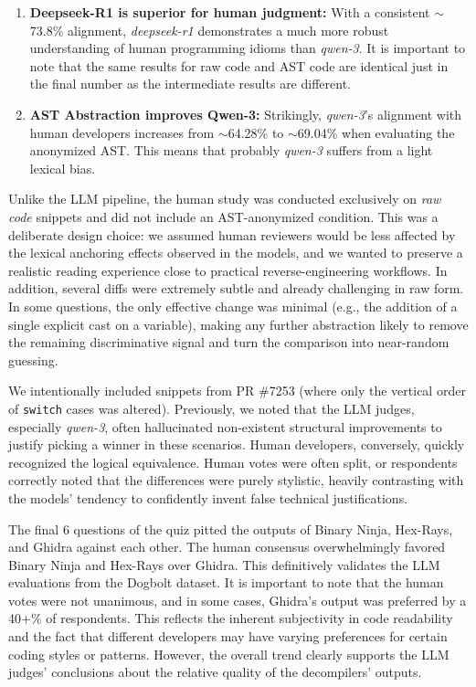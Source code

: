 \begin{enumerate}
    \item \textbf{Deepseek-R1 is superior for human judgment:} With a consistent $\sim$73.8\% alignment, \emph{deepseek-r1} demonstrates a much more robust understanding of human programming idioms than \emph{qwen-3}. It is important to note that the same results for raw code and \ac{AST} code are identical just in the final number as the intermediate results are different.
    \item \textbf{AST Abstraction improves Qwen-3:} Strikingly, \emph{qwen-3}'s alignment with human developers increases from $\sim$64.28\% to $\sim$69.04\% when evaluating the anonymized \ac{AST}. This means that probably \emph{qwen-3} suffers from a light lexical bias.
\end{enumerate}

Unlike the \ac{LLM} pipeline, the human study was conducted exclusively on \emph{raw code} snippets and did not include an \ac{AST}-anonymized condition. This was a deliberate design choice: we assumed human reviewers would be less affected by the lexical anchoring effects observed in the models, and we wanted to preserve a realistic reading experience close to practical reverse-engineering workflows. In addition, several diffs were extremely subtle and already challenging in raw form. In some questions, the only effective change was minimal (e.g., the addition of a single explicit cast on a variable), making any further abstraction likely to remove the remaining discriminative signal and turn the comparison into near-random guessing.

We intentionally included snippets from PR \#7253 (where only the vertical order of \texttt{switch} cases was altered). Previously, we noted that the \ac{LLM} judges, especially \emph{qwen-3}, often hallucinated non-existent structural improvements to justify picking a winner in these scenarios. 
Human developers, conversely, quickly recognized the logical equivalence. Human votes were often split, or respondents correctly noted that the differences were purely stylistic, heavily contrasting with the models' tendency to confidently invent false technical justifications.

The final 6 questions of the quiz pitted the outputs of Binary Ninja, Hex-Rays, and Ghidra against each other. The human consensus overwhelmingly favored Binary Ninja and Hex-Rays over Ghidra. 
This definitively validates the \ac{LLM} evaluations from the Dogbolt dataset. It is important to note that the human votes were not unanimous, and in some cases, Ghidra's output was preferred by a 40+\% of respondents. This reflects the inherent subjectivity in code readability and the fact that different developers may have varying preferences for certain coding styles or patterns. However, the overall trend clearly supports the LLM judges' conclusions about the relative quality of the decompilers' outputs.

